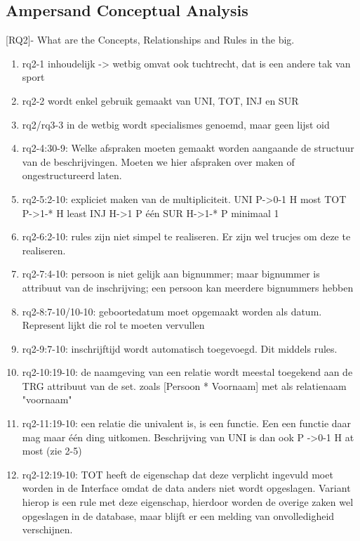 \subsection{Ampersand Conceptual Analysis}
[RQ2]- What are the Concepts, Relationships and Rules in the \acrshort{big}.
\begin{enumerate}
    \item rq2-1 inhoudelijk -> wetbig omvat ook tuchtrecht, dat is een andere tak van sport
    \item rq2-2 wordt enkel gebruik gemaakt van UNI, TOT, INJ en SUR
    \item rq2/rq3-3 in de wetbig wordt specialismes genoemd, maar geen lijst oid
    \item rq2-4:30-9: Welke afspraken moeten gemaakt worden aangaande de structuur van de beschrijvingen. 
    Moeten we hier afspraken over maken of ongestructureerd laten.
    \item rq2-5:2-10: expliciet maken van de multipliciteit.\newline
    UNI P->0-1 H  most\newline
    TOT P->1-* H  least\newline
    INJ H->1 P    één\newline
    SUR H->1-* P  minimaal 1
    \item rq2-6:2-10: rules zijn niet simpel te realiseren. Er zijn wel trucjes om deze te realiseren.
    \item rq2-7:4-10: persoon is niet gelijk aan bignummer; maar bignummer is attribuut van de inschrijving; een persoon kan meerdere bignummers hebben
    \item rq2-8:7-10/10-10: geboortedatum moet opgemaakt worden als datum. Represent lijkt die rol te moeten vervullen
    \item rq2-9:7-10: inschrijftijd wordt automatisch toegevoegd. Dit middels rules.
    \item rq2-10:19-10: de naamgeving van een relatie wordt meestal toegekend aan de TRG attribuut van de set. zoals [Persoon * Voornaam] met als relatienaam "voornaam"
    \item rq2-11:19-10: een relatie die univalent is, is een functie. Een een functie daar mag maar één ding uitkomen. Beschrijving van UNI is dan ook P ->0-1 H at most (zie 2-5)
    \item rq2-12:19-10: TOT heeft de eigenschap dat deze verplicht ingevuld moet worden in de Interface omdat de data anders niet wordt opgeslagen. Variant hierop is een rule met deze eigenschap, hierdoor worden de overige zaken wel opgeslagen in de database, maar blijft er een melding van onvolledigheid verschijnen.

\end{enumerate}
